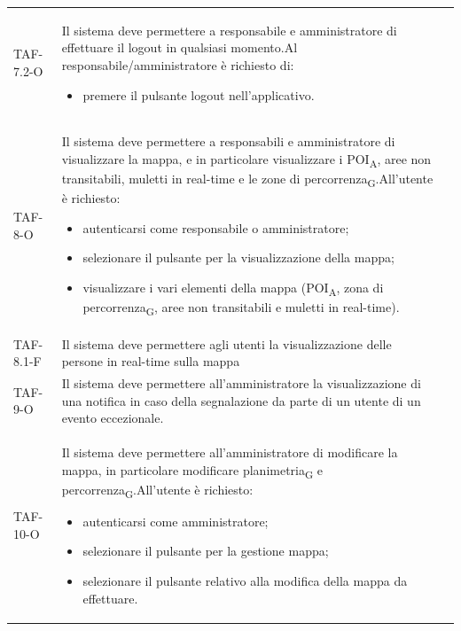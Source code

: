 \begin{longtable}{ >{\centering}p{} >{}p{}
		>{\centering}p{}}
	TAF-7.2-O & Il sistema deve permettere a responsabile e amministratore di effettuare il logout in qualsiasi momento.\newline Al responsabile/amministratore è richiesto di: \begin{itemize} \item premere il pulsante logout nell'applicativo. \end{itemize} & 0\tabularnewline

	TAF-8-O & Il sistema deve permettere a responsabili e amministratore di visualizzare la mappa, e in particolare visualizzare i POI\textsubscript{A}, aree non transitabili, muletti in real-time e le zone di percorrenza\textsubscript{G}.\newline All'utente è richiesto:\begin{itemize} \item autenticarsi come responsabile o amministratore; \item selezionare il pulsante per la visualizzazione della mappa; \item visualizzare i vari elementi della mappa (POI\textsubscript{A}, zona di percorrenza\textsubscript{G}, aree non transitabili e muletti in real-time). \end{itemize} & 0\tabularnewline

	TAF-8.1-F & Il sistema deve permettere agli utenti la visualizzazione delle persone in real-time sulla mappa & 0\tabularnewline

	TAF-9-O & Il sistema deve permettere all'amministratore la visualizzazione di una notifica in caso della segnalazione da parte di un utente di un evento eccezionale. & 0\tabularnewline

	TAF-10-O & Il sistema deve permettere all'amministratore di modificare la mappa, in particolare modificare planimetria\textsubscript{G} e percorrenza\textsubscript{G}.\newline All'utente è richiesto: \begin{itemize} \item autenticarsi come amministratore; \item selezionare il pulsante per la gestione mappa; \item selezionare il pulsante relativo alla modifica della mappa da effettuare.\end{itemize} & 0\tabularnewline


\end{longtable}
